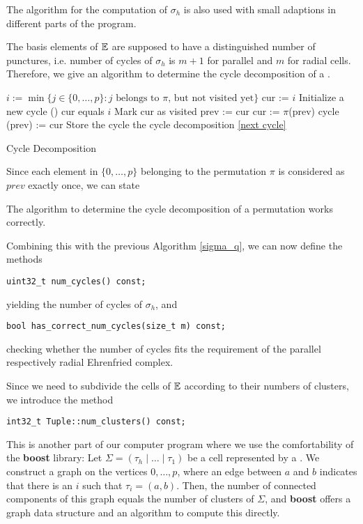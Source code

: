 The algorithm for the computation of $\sigma_h$ is also used with small adaptions in different parts of the program.

The basis elements of $\mathbb E$ are supposed to have a distinguished number of punctures, 
i.e. number of cycles of $\sigma_h$ is $m+1$ for parallel and $m$ for radial cells.
Therefore, we give an algorithm to determine the cycle decomposition of a .

\begin{algorithm}[H]
\label{Cycle Decomp}
\DontPrintSemicolon
{}


$i := \min\{j \in \{0, \dotsc, p\} \colon j \text{ belongs to $\pi$, but not visited yet}\}$ \label{next cycle}\;
cur := $i$\; 
Initialize a new cycle\;
\Repeat(){ cur equals $i$}
{	
  Mark cur as visited\;
	prev := cur\;
	cur := $\pi$(prev)\;
	cycle (prev) := cur\;
}
Store the cycle\;
{
  \KwRet the cycle decomposition\; 
}
\KwGoTo \ref{next cycle}\;

\caption{Cycle Decomposition}

\end{algorithm}

Since each element in $\{0, \dotsc, p\}$ belonging to the permutation $\pi$ is considered as $prev$ exactly once, we can state

\begin{prop}
The algorithm to determine the cycle decomposition of a permutation works correctly.
\end{prop}

Combining this with the previous Algorithm \ref{sigma_q}, we can now define the methods
\begin{lstlisting}
uint32_t num_cycles() const;
\end{lstlisting}
yielding the number of cycles of $\sigma_h$, and
\begin{lstlisting}
bool has_correct_num_cycles(size_t m) const;
\end{lstlisting}
checking whether the number of cycles fits the requirement of the parallel respectively radial Ehrenfried complex.

Since we need to subdivide the cells of $\mathbb E$ according to their numbers of clusters, 
we introduce the method
\begin{lstlisting}
int32_t Tuple::num_clusters() const;
\end{lstlisting}
This is another part of our computer program where we use the comfortability of the \textbf{boost} library:
Let $\Sigma = (\tau_h \mid \dotsc \mid \tau_1)$ be a cell represented by a .
We construct a graph on the vertices $0, \dotsc, p$,
where an edge between $a$ and $b$ indicates that there is an $i$ such that $\tau_i = (a, b)$.
Then, the number of connected components of this graph equals the number of clusters of $\Sigma$,
and \textbf{boost} offers a graph data structure and an algorithm to compute this directly.

